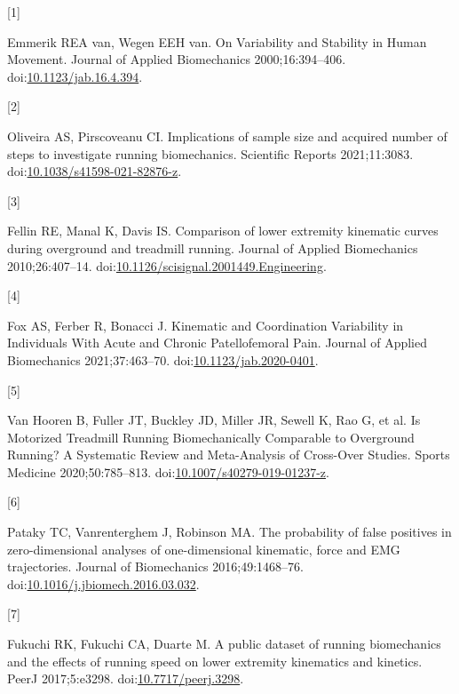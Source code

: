 \documentclass[]{elsarticle} %
\newlength{\cslhangindent}
\newlength{\csllabelwidth}
\newlength{\cslentryspacingunit} %
\newenvironment{CSLReferences}[2] %
 {%
  \setlength{\parindent}{0pt}
  \ifodd #1
  \let\oldpar\par
  \def\par{\hangindent=\cslhangindent\oldpar}
  \fi
  \setlength{\parskip}{#2\cslentryspacingunit}
 }%
 {}
\newcommand{\CSLLeftMargin}[1]{\parbox[t]{\csllabelwidth}{#1}}
\newcommand{\CSLRightInline}[1]{\parbox[t]{\linewidth - \csllabelwidth}{#1}\break}
\begin{document}
\hypertarget{refs}{}
\begin{CSLReferences}{0}{0}
\leavevmode{}%
\CSLLeftMargin{{[}1{]} }
\CSLRightInline{Emmerik REA van, Wegen EEH van. {On Variability and
Stability in Human Movement}. Journal of Applied Biomechanics
2000;16:394--406.
doi:\href{https://doi.org/10.1123/jab.16.4.394}{10.1123/jab.16.4.394}.}

\leavevmode{}%
\CSLLeftMargin{{[}2{]} }
\CSLRightInline{Oliveira AS, Pirscoveanu CI. {Implications of sample
size and acquired number of steps to investigate running biomechanics}.
Scientific Reports 2021;11:3083.
doi:\href{https://doi.org/10.1038/s41598-021-82876-z}{10.1038/s41598-021-82876-z}.}

\leavevmode{}%
\CSLLeftMargin{{[}3{]} }
\CSLRightInline{Fellin RE, Manal K, Davis IS. {Comparison of lower
extremity kinematic curves during overground and treadmill running.}
Journal of Applied Biomechanics 2010;26:407--14.
doi:\href{https://doi.org/10.1126/scisignal.2001449.Engineering}{10.1126/scisignal.2001449.Engineering}.}

\leavevmode{}%
\CSLLeftMargin{{[}4{]} }
\CSLRightInline{Fox AS, Ferber R, Bonacci J. {Kinematic and Coordination
Variability in Individuals With Acute and Chronic Patellofemoral Pain}.
Journal of Applied Biomechanics 2021;37:463--70.
doi:\href{https://doi.org/10.1123/jab.2020-0401}{10.1123/jab.2020-0401}.}

\leavevmode{}%
\CSLLeftMargin{{[}5{]} }
\CSLRightInline{Van Hooren B, Fuller JT, Buckley JD, Miller JR, Sewell
K, Rao G, et al. {Is Motorized Treadmill Running Biomechanically
Comparable to Overground Running? A Systematic Review and Meta-Analysis
of Cross-Over Studies}. Sports Medicine 2020;50:785--813.
doi:\href{https://doi.org/10.1007/s40279-019-01237-z}{10.1007/s40279-019-01237-z}.}

\leavevmode{}%
\CSLLeftMargin{{[}6{]} }
\CSLRightInline{Pataky TC, Vanrenterghem J, Robinson MA. {The
probability of false positives in zero-dimensional analyses of
one-dimensional kinematic, force and EMG trajectories}. Journal of
Biomechanics 2016;49:1468--76.
doi:\href{https://doi.org/10.1016/j.jbiomech.2016.03.032}{10.1016/j.jbiomech.2016.03.032}.}

\leavevmode{}%
\CSLLeftMargin{{[}7{]} }
\CSLRightInline{Fukuchi RK, Fukuchi CA, Duarte M. {A public dataset of
running biomechanics and the effects of running speed on lower extremity
kinematics and kinetics}. PeerJ 2017;5:e3298.
doi:\href{https://doi.org/10.7717/peerj.3298}{10.7717/peerj.3298}.}


\end{CSLReferences}
\end{document}

